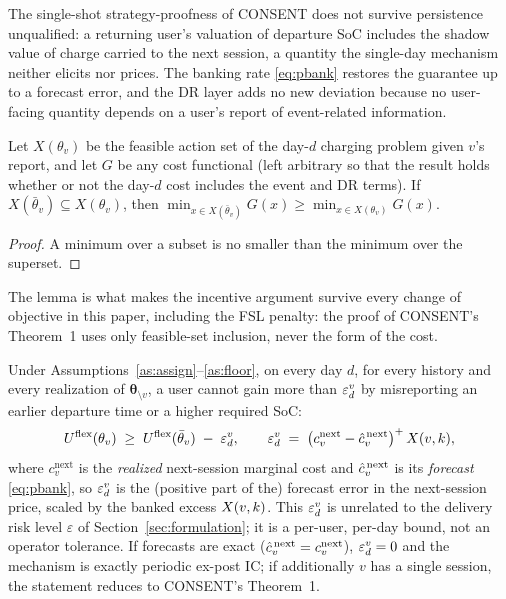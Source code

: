 The single-shot strategy-proofness of CONSENT does not survive
persistence unqualified: a returning user's valuation of departure SoC
includes the shadow value of charge carried to the next session, a
quantity the single-day mechanism neither elicits nor prices. The
banking rate \eqref{eq:pbank} restores the guarantee up to a forecast
error, and the DR layer adds no new deviation because no user-facing
quantity depends on a user's report of event-related information.

\begin{lemma}\label{lem:setincl}
Let $X(\theta_v)$ be the feasible action set of the day-$d$ charging
problem given $v$'s report, and let $G$ be any cost functional (left arbitrary so that the result holds whether or not the day-$d$ cost includes the event and DR terms). If
$X(\bar\theta_v) \subseteq X(\theta_v)$, then
$\min_{x \in X(\bar\theta_v)} G(x) \ge \min_{x \in X(\theta_v)} G(x)$.
\end{lemma}

\begin{proof}
A minimum over a subset is no smaller than the minimum over the
superset.
\end{proof}

The lemma is what makes the incentive argument survive every change of
objective in this paper, including the FSL penalty: the proof of
CONSENT's Theorem~1 uses only feasible-set inclusion, never the form of
the cost.

\begin{theorem}\label{thm:ic}
Under Assumptions~\ref{as:assign}--\ref{as:floor}, on every day $d$,
for every history and every realization of
$\bm{\theta}_{\setminus v}$, a user cannot gain more than
$\varepsilon^{v}_{d}$ by misreporting an earlier departure time or a higher
required SoC:
\[
U^{\mathrm{flex}}(\theta_v) \;\ge\; U^{\mathrm{flex}}(\bar\theta_v) \;-\; \varepsilon^{v}_{d},
\qquad
\varepsilon^{v}_{d} \;=\; \bigl(c^{\mathrm{next}}_{v} -
\hat{c}^{\,\mathrm{next}}_{v}\bigr)^{+}\, X(v,k),
\]
where $c^{\mathrm{next}}_{v}$ is the \emph{realized} next-session marginal cost and $\hat{c}^{\,\mathrm{next}}_{v}$ is its \emph{forecast} \eqref{eq:pbank}, so $\varepsilon^{v}_{d}$ is the (positive part of the) forecast error in the next-session price, scaled by the banked excess $X(v,k)$. This $\varepsilon^{v}_{d}$ is unrelated to the delivery risk level $\varepsilon$ of Section~\ref{sec:formulation}; it is a per-user, per-day bound, not an operator tolerance. If forecasts are exact ($\hat{c}^{\,\mathrm{next}}_{v} = c^{\mathrm{next}}_{v}$), $\varepsilon^{v}_{d} = 0$ and the mechanism is exactly periodic ex-post IC; if additionally $v$ has a single session, the statement
reduces to CONSENT's Theorem~1.
\end{theorem}


